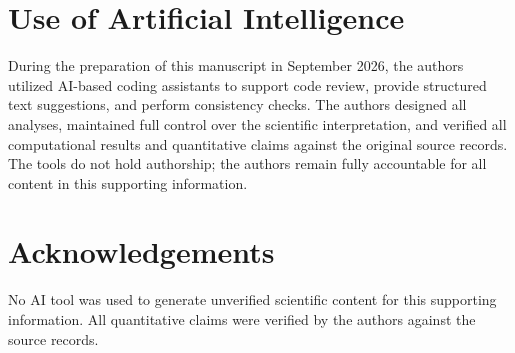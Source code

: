 \documentclass[journal=jcisd8,manuscript=suppinfo,layout=traditional]{achemso}
\begin{document}












\section*{Use of Artificial Intelligence}

During the preparation of this manuscript in September 2026, the authors utilized AI-based coding assistants to support code review, provide structured text suggestions, and perform consistency checks. The authors designed all analyses, maintained full control over the scientific interpretation, and verified all computational results and quantitative claims against the original source records. The tools do not hold authorship; the authors remain fully accountable for all content in this supporting information.

\section*{Acknowledgements}

No AI tool was used to generate unverified scientific content for this supporting information. All quantitative claims were verified by the authors against the source records.


\end{document}
